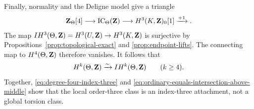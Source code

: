Finally, normality and the Deligne model give a triangle
\[
 \mathbf Z_\Theta[4]\longrightarrow\operatorname{IC}_\Theta(\mathbf Z)
 \longrightarrow H^3(K,\mathbf Z)_0[1]\xrightarrow{+1}.
\]
The map \(IH^3(\Theta,\mathbf Z)=H^3(U,\mathbf Z)\to H^3(K,\mathbf Z)\) is surjective by
Propositions~\ref{prop:topological-exact} and
\ref{prop:endpoint-lifts}.  The connecting map to \(H^4(\Theta,\mathbf Z)\)
therefore vanishes.  It follows that
\begin{equation}\label{eq:ordinary-equals-intersection-above-middle}
 H^k(\Theta,\mathbf Z)\xrightarrow{\sim}IH^k(\Theta,\mathbf Z)
 \qquad(k\geq4).
\end{equation}
Together, \eqref{eq:degree-four-index-three} and
\eqref{eq:ordinary-equals-intersection-above-middle} show that the local
order-three class is an index-three attachment, not a global torsion class.
